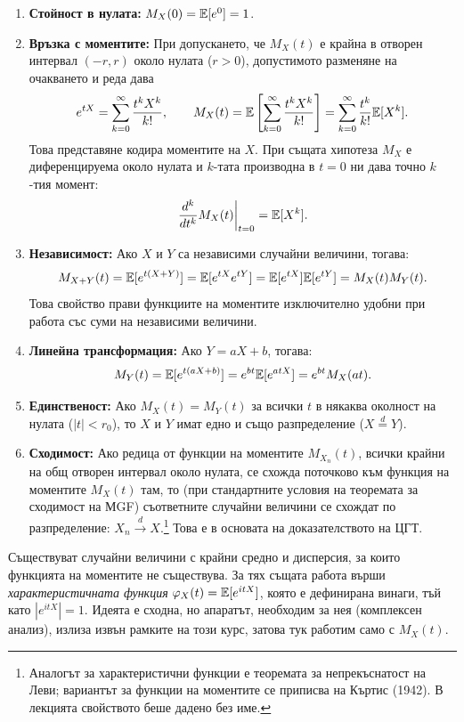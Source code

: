 \begin{enumerate}
    \item \textbf{Стойност в нулата:} $M_X(0) = \mathbb{E}[e^0] = 1$.
    \item \textbf{Връзка с моментите:} При допускането, че $M_X(t)$ е крайна в отворен интервал $(-r,r)$ около нулата ($r>0$), допустимото разменяне на очакването и реда дава
    \[ e^{tX} = \sum_{k=0}^\infty \frac{t^k X^k}{k!}, \qquad M_X(t) = \mathbb{E} \left[ \sum_{k=0}^\infty \frac{t^k X^k}{k!} \right] = \sum_{k=0}^\infty \frac{t^k}{k!} \mathbb{E}[X^k]. \]
    Това представяне кодира моментите на $X$. При същата хипотеза $M_X$ е диференцируема около нулата и $k$-тата производна в $t=0$ ни дава точно $k$-тия момент:
    \[ \left. \frac{d^k}{dt^k} M_X(t) \right|_{t=0} = \mathbb{E}[X^k]. \]
    \item \textbf{Независимост:} Ако $X$ и $Y$ са независими случайни величини, тогава:
    \[ M_{X+Y}(t) = \mathbb{E}[e^{t(X+Y)}] = \mathbb{E}[e^{tX} e^{tY}] = \mathbb{E}[e^{tX}] \mathbb{E}[e^{tY}] = M_X(t) M_Y(t). \]
    Това свойство прави функциите на моментите изключително удобни при работа със суми на независими величини.
    \item \textbf{Линейна трансформация:} Ако $Y = aX + b$, тогава:
    \[ M_Y(t) = \mathbb{E}[e^{t(aX+b)}] = e^{bt} \mathbb{E}[e^{atX}] = e^{bt} M_X(at). \]
    \item \textbf{Единственост:} Ако $M_X(t) = M_Y(t)$ за всички $t$ в някаква околност на нулата ($|t| < r_0$), то $X$ и $Y$ имат едно и също разпределение ($X \stackrel{d}{=} Y$).
    \item \textbf{Сходимост:} Ако редица от функции на моментите $M_{X_n}(t)$, всички крайни на общ отворен интервал около нулата, се схожда поточково към функция на моментите $M_X(t)$ там, то (при стандартните условия на теоремата за сходимост на МGF) съответните случайни величини се схождат по разпределение: $X_n \xrightarrow{d} X$.\footnote{Аналогът за характеристични функции е теоремата за непрекъснатост на Леви; вариантът за функции на моментите се приписва на Къртис (1942). В лекцията свойството беше дадено без име.} Това е в основата на доказателството на ЦГТ.
\end{enumerate}

\begin{remark}\label{rem:charfun}
Съществуват случайни величини с крайни средно и дисперсия, за които функцията на
моментите не съществува. За тях същата работа върши \emph{характеристичната
функция} $\varphi_X(t) = \mathbb{E}[e^{itX}]$, която е дефинирана винаги, тъй като
$|e^{itX}| = 1$. Идеята е сходна, но апаратът, необходим за нея (комплексен
анализ), излиза извън рамките на този курс, затова тук работим само с $M_X(t)$.
\end{remark}

